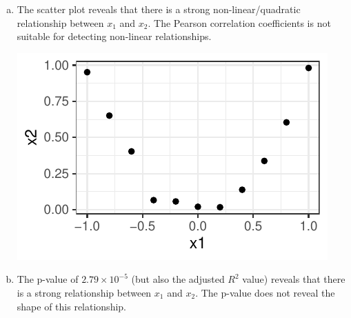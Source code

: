 {\begin{enumerate}[a)]
  The Pearson correlation coefficient is close to 0 - reflecting that there is no \textbf{linear} relationship between $x_1$ and $x_2$.
  
  \item  The scatter plot reveals that there is a strong non-linear/quadratic relationship between $x_1$ and $x_2$. The Pearson correlation coefficients is not suitable
  for detecting non-linear relationships.
  
\begin{center}
\includegraphics[width=\maxwidth]{figure/add_Points_x1_x2_sol.pdf}
\end{center}
 
  \item The p-value of $2.79 \times 10^{-5}$ (but also the adjusted $R^2$ value) reveals that there is a strong relationship between $x_1$ and $x_2$.
  The p-value does not reveal the shape of this relationship.
  

\end{enumerate}}
